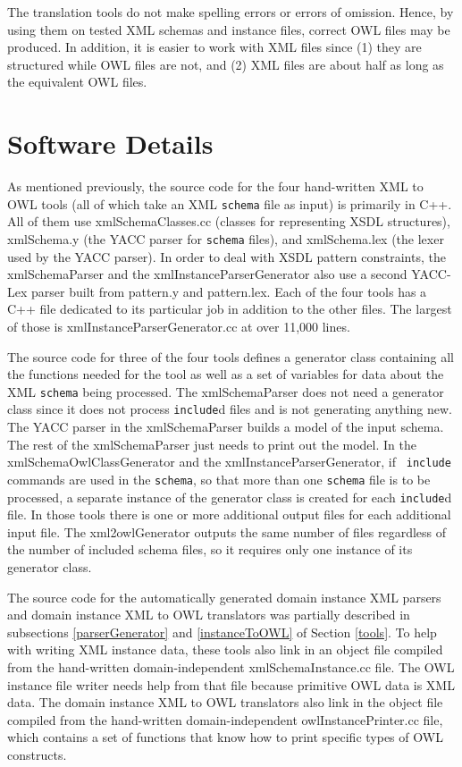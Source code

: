 \documentclass[preprint,12pt]{elsarticle}
\begin{document}
The translation tools do not make spelling errors or errors of omission.
Hence, by using them on tested XML schemas and instance files, correct OWL
files may be produced. In addition, it is easier to work with XML files
since (1) they are structured while OWL files are not, and (2) XML files
are about half as long as the equivalent OWL files.

\section{Software Details}
\label{softwareDetails}

As mentioned previously, the source code for the four hand-written XML to
OWL tools (all of which take an XML {\tt schema} file as input) is primarily in
C++. All of them use xmlSchemaClasses.cc (classes for representing XSDL
structures), xmlSchema.y (the YACC parser for {\tt schema} files), and
xmlSchema.lex (the lexer used by the YACC parser). In order to deal with
XSDL pattern constraints, the xmlSchemaParser and the
xmlInstanceParserGenerator also use a second YACC-Lex parser built from
pattern.y and pattern.lex. Each of the four tools has a C++ file dedicated
to its particular job in addition to the other files. The largest of those
is xmlInstanceParserGenerator.cc at over 11,000 lines.

The source code for three of the four tools defines a generator class
containing all the functions needed for the tool as well as a set of
variables for data about the XML {\tt schema} being processed. The
xmlSchemaParser does not need a generator class since it does not process
{\tt include}d files and is not generating anything new. The YACC parser in
the xmlSchemaParser builds a model of the input schema. The rest of the
xmlSchemaParser just needs to print out the model. In the
xmlSchemaOwlClassGenerator and the xmlInstanceParserGenerator, if {\tt
  include} commands are used in the {\tt schema}, so that more than one
{\tt schema} file is to be processed, a separate instance of the generator
class is created for each {\tt include}d file. In those tools there is one
or more additional output files for each additional input file. The
xml2owlGenerator outputs the same number of files regardless of the number
of included schema files, so it requires only one instance of its generator
class.

The source code for the automatically generated domain instance XML parsers
and domain instance XML to OWL translators was partially described in
subsections \ref{parserGenerator} and \ref{instanceToOWL} of Section
\ref{tools}. To help with writing XML instance data, these tools also link
in an object file compiled from the hand-written domain-independent
xmlSchemaInstance.cc file. The OWL instance file writer needs help from
that file because primitive OWL data is XML data. The domain instance XML
to OWL translators also link in the object file compiled from the
hand-written domain-independent owlInstancePrinter.cc file, which contains
a set of functions that know how to print specific types of OWL constructs.
\end{document}
